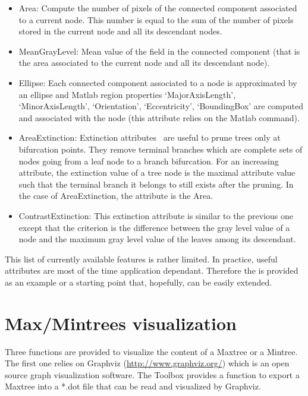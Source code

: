 \documentclass[DIV=calc, paper=a4, fontsize=11pt]{scrartcl}	 %
\begin{document}
\begin{itemize}
\item Area: Compute the number of pixels of the connected component associated to a current node. This number is equal to the sum of the number of pixels stored in the current node and all its descendant nodes.
\item MeanGrayLevel: Mean value of the  field in the connected component (that is the area associated to the current node and all its descendant node). 
\item Ellipse: Each connected component associated to a node is approximated by an ellipse and Matlab region properties
`MajorAxisLength', `MinorAxisLength', `Orientation', `Eccentricity', `BoundingBox' are computed and associated with the node (this attribute relies on the Matlab  command).
\item AreaExtinction:  Extinction attributes~\cite{Vachier-NSIP-1995} are useful to prune trees only at bifurcation 
points. They remove terminal branches which are complete sets of nodes going from a leaf node to a branch bifurcation. 
For an increasing attribute, the extinction value of a tree node is the maximal attribute value such that the terminal 
branch it belongs to still exists after the pruning. In the case of AreaExtinction, the attribute is the Area. 
\item ContrastExtinction:  This extinction attribute is similar to the previous one except that the criterion is the difference between the 
gray level value of a node and the maximum gray level value of the leaves among its descendant. 
\end{itemize}
This list of currently available features is rather limited. In practice, useful attributes are most of the time application dependant. Therefore the  is provided as an example or a starting point that, hopefully, can be easily extended. 

\section{Max/Mintrees visualization}
Three functions are provided to visualize the content of a Maxtree or a Mintree. The first one relies on Graphviz (\url{http://www.graphviz.org/}) which is an open source graph visualization software. The Toolbox provides a function to export a Maxtree into a *.dot file that can be read and visualized by Graphviz. 
\end{document}
